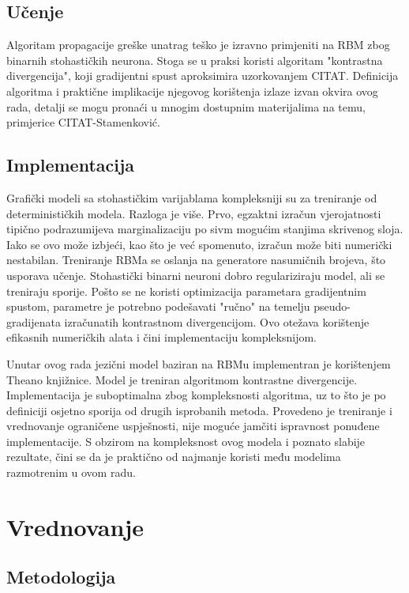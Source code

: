 \documentclass[times, utf8, diplomski, numeric]{fer}
\begin{document}
\section{Učenje}

Algoritam propagacije greške unatrag teško je izravno primjeniti na RBM zbog binarnih stohastičkih neurona. Stoga se u praksi koristi algoritam "kontrastna divergencija", koji gradijentni spust aproksimira uzorkovanjem CITAT. Definicija algoritma i praktične implikacije njegovog korištenja izlaze izvan okvira ovog rada, detalji se mogu pronaći u mnogim dostupnim materijalima na temu, primjerice CITAT-Stamenković.

\section{Implementacija}

Grafički modeli sa stohastičkim varijablama kompleksniji su za treniranje od determinističkih modela. Razloga je više. Prvo, egzaktni izračun vjerojatnosti tipično podrazumijeva marginalizaciju po sivm mogućim stanjima skrivenog sloja. Iako se ovo može izbjeći, kao što je već spomenuto, izračun može biti numerički nestabilan. Treniranje RBMa se oslanja na generatore nasumičnih brojeva, što usporava učenje. Stohastički binarni neuroni dobro regulariziraju model, ali se treniraju sporije. Pošto se ne koristi optimizacija parametara gradijentnim spustom, parametre je potrebno podešavati "ručno" na temelju pseudo-gradijenata izračunatih kontrastnom divergencijom. Ovo otežava korištenje efikasnih numeričkih alata i čini implementaciju kompleksnijom.

Unutar ovog rada jezični model baziran na RBMu implementran je korištenjem Theano knjižnice. Model je treniran algoritmom kontrastne divergencije. Implementacija je suboptimalna zbog kompleksnosti algoritma, uz to što je po definiciji osjetno sporija od drugih isprobanih metoda. Provedeno je treniranje i vrednovanje ograničene uspješnosti, nije moguće jamčiti ispravnost ponuđene implementacije. S obzirom na kompleksnost ovog modela i poznato slabije rezultate, čini se da je praktično od najmanje koristi među modelima razmotrenim u ovom radu.

\chapter{Vrednovanje}
\label{sec:eval}

\section{Metodologija}
\end{document}
